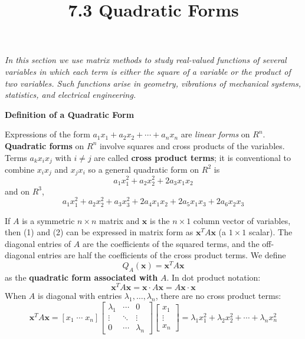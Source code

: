 \documentclass{article}
\title{7.3 Quadratic Forms}
\date{}
\author{}
\newcommand{\redheading}[1]{{\vspace{2mm}\noindent\Large\bfseries\color{red!55!black} #1\par}\vspace{2mm}}
\begin{document}
\maketitle

{\itshape\color{blue!45!black}
In this section we use matrix methods to study real-valued functions of several
variables in which each term is either the square of a variable or the product of
two variables. Such functions arise in geometry, vibrations of mechanical systems,
statistics, and electrical engineering.\par}

\vspace{2mm}

\redheading{Definition of a Quadratic Form}

Expressions of the form $a_1x_1+a_2x_2+\cdots+a_nx_n$ are \emph{linear forms} on $R^n$.
\textbf{Quadratic forms} on $R^n$ involve squares and cross products of the variables.
Terms $a_kx_ix_j$ with $i\neq j$ are called \textbf{cross product terms}; it is conventional
to combine $x_ix_j$ and $x_jx_i$ so a general quadratic form on $R^2$ is
\begin{equation}
  a_1x_1^2 + a_2x_2^2 + 2a_3x_1x_2 \tag{1}
\end{equation}
and on $R^3$,
\begin{equation}
  a_1x_1^2+a_2x_2^2+a_3x_3^2+2a_4x_1x_2+2a_5x_1x_3+2a_6x_2x_3 \tag{2}
\end{equation}

If $A$ is a symmetric $n\times n$ matrix and $\mathbf{x}$ is the $n\times 1$ column vector
of variables, then (1) and (2) can be expressed in matrix form as $\mathbf{x}^T A\mathbf{x}$
(a $1\times1$ scalar). The diagonal entries of $A$ are the coefficients of the squared terms,
and the off-diagonal entries are half the coefficients of the cross product terms. We define
\begin{equation}
  Q_A(\mathbf{x}) = \mathbf{x}^T A\mathbf{x} \tag{3}
\end{equation}
as the \textbf{quadratic form associated with} $A$. In dot product notation:
\begin{equation}
  \boxed{\mathbf{x}^T A\mathbf{x} = \mathbf{x}\cdot A\mathbf{x} = A\mathbf{x}\cdot\mathbf{x}} \tag{4}
\end{equation}
When $A$ is diagonal with entries $\lambda_1,\ldots,\lambda_n$, there are no cross product terms:
\[
  \mathbf{x}^T A\mathbf{x} = [x_1\;\cdots\;x_n]
  \begin{bmatrix}\lambda_1&\cdots&0\\\vdots&\ddots&\vdots\\0&\cdots&\lambda_n\end{bmatrix}
  \begin{bmatrix}x_1\\\vdots\\x_n\end{bmatrix}
  = \lambda_1x_1^2+\lambda_2x_2^2+\cdots+\lambda_nx_n^2
\]
\end{document}
